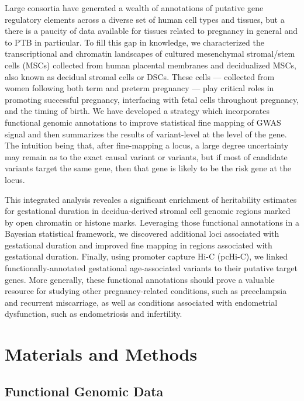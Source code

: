 Large consortia have generated a wealth of annotations of putative gene regulatory elements across a diverse set of human cell types and tissues, but a there is a paucity of data available for tissues related to pregnancy in general and to PTB in particular.  To fill this gap in knowledge, we characterized the transcriptional and chromatin landscapes of cultured mesenchymal stromal/stem cells (MSCs) collected from human placental membranes and decidualized MSCs, also known as decidual stromal cells or DSCs. These cells --- collected from women following both term and preterm pregnancy --- play critical roles in promoting successful pregnancy, interfacing with fetal cells throughout pregnancy, and the timing of birth.  We have developed a strategy which incorporates functional genomic annotations to improve statistical fine mapping of GWAS signal and then summarizes the results of variant-level at the level of the gene. The intuition being that, after fine-mapping a locus, a large degree uncertainty may remain as to the exact causal variant or variants, but if most of candidate variants target the same gene, then that gene is likely to be the risk gene at the locus.

This integrated analysis reveales a significant enrichment of heritability estimates for gestational duration in decidua-derived stromal cell genomic regions marked by open chromatin or histone marks. Leveraging those functional annotations in a Bayesian statistical framework, we discovered additional loci associated with gestational duration and improved fine mapping in regions associated with gestational duration. Finally, using promoter capture Hi-C (pcHi-C), we linked functionally-annotated gestational age-associated variants to their putative target genes. More generally, these functional annotations should prove a valuable resource for studying other pregnancy-related conditions, such as preeclampsia and recurrent miscarriage, as well as conditions associated with endometrial dysfunction, such as endometriosis and infertility.

\section{Materials and Methods}\label{sec:org39326e2}

\subsection{Functional Genomic Data}\label{sec:org702e301}
  
